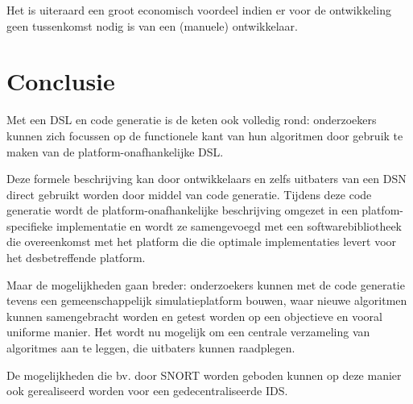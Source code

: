 Het is uiteraard een groot economisch voordeel indien er voor de ontwikkeling
geen tussenkomst nodig is van een (manuele) ontwikkelaar.

\section{Conclusie}
\label{section:solution-conclusion}

Met een DSL en code generatie is de keten ook volledig rond: onderzoekers
kunnen zich focussen op de functionele kant van hun algoritmen door gebruik te
maken van de platform-onafhankelijke DSL.

Deze formele beschrijving kan door ontwikkelaars en zelfs uitbaters van een DSN
direct gebruikt worden door middel van code generatie. Tijdens deze code
generatie wordt de platform-onafhankelijke beschrijving omgezet in een
platfom-specifieke implementatie en wordt ze samengevoegd met een
softwarebibliotheek die overeenkomst met het platform die die optimale
implementaties levert voor het desbetreffende platform.

Maar de mogelijkheden gaan breder: onderzoekers kunnen met de code generatie
tevens een gemeenschappelijk simulatieplatform bouwen, waar nieuwe algoritmen
kunnen samengebracht worden en getest worden op een objectieve en vooral
uniforme manier. Het wordt nu mogelijk om een centrale verzameling van
algoritmes aan te leggen, die uitbaters kunnen raadplegen.

De mogelijkheden die bv. door SNORT worden geboden kunnen op deze manier ook
gerealiseerd worden voor een gedecentraliseerde IDS.
